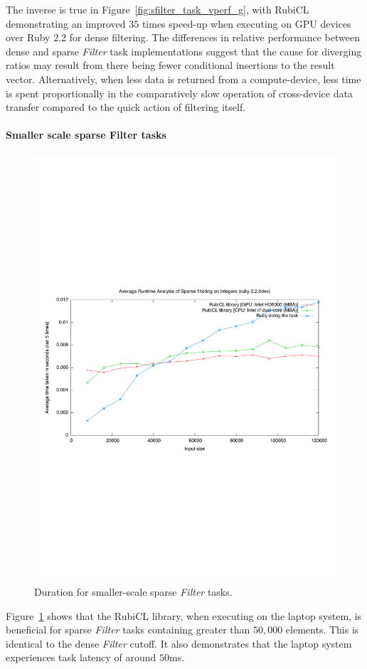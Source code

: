 The inverse is true in Figure~\ref{fig:sfilter_task_vperf_g}, with RubiCL demonstrating an improved $3$\textendash$5$ times speed-up when executing on \ac{GPU} devices over Ruby $2.2$ for dense filtering.
The differences in relative performance between dense and sparse \emph{Filter} task implementations suggest that the cause for diverging ratios may result from there being fewer conditional insertions to the result vector. Alternatively, when less data is returned from a compute-device, less time is spent proportionally in the comparatively slow operation of cross-device data transfer compared to the quick action of filtering itself.

\paragraph*{Smaller scale sparse Filter tasks}
\begin{figure}[H]
  \includegraphics[trim=0cm 8cm 0cm 8cm, clip=true, width=\textwidth]{./graphing/smallsparsefilter.pdf}
  \caption{Duration for smaller-scale sparse \emph{Filter} tasks.}
  \label{fig:sparsefil_tasksmallrun}
\end{figure}
Figure~\ref{fig:sparsefil_tasksmallrun} shows that the RubiCL library, when executing on the laptop system, is beneficial for sparse \emph{Filter} tasks containing greater than $50,000$ elements. This is identical to the dense \emph{Filter} cutoff. It also demonstrates that the laptop system experiences task latency of around $50$ms.

